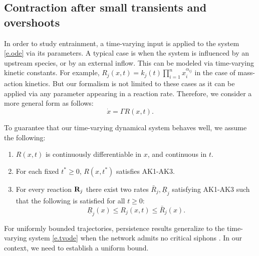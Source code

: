 \documentclass[onefignum,onetabnum]{siamonline220329}
\newcommand{\R}{{\rm \bf R}}
\begin{document}
{\subsection{Contraction after small transients and overshoots}

In order to study entrainment, a time-varying input is applied to the system \eqref{e.ode} via its parameters. A typical case is when the system is influenced by an upstream species, or by an external inflow. This can be modeled via time-varying kinetic constants. For example, $R_j(x,t)=k_j(t) \prod_{i=1}^n x_i^{\alpha_{ij}}$ in the case of mass-action kinetics.  But our formalism is not limited to these cases as it can be applied via any parameter appearing in a reaction rate. Therefore, we consider a more general form as follows:
\begin{equation}\label{e.tvode}
	\dot x= \Gamma R(x,t).
\end{equation}

To guarantee that our time-varying dynamical system behaves well, we assume the following:
\begin{enumerate}
	\item $R(x,t)$ is continuously differentiable in $x$, and continuous in $t$. 
	\item For each fixed $t^*\ge 0$, $R(x,t^*)$ satisfies AK1-AK3.
	
	\item For every reaction $\R_j$ there exist two rates $\bar R_j, \underline R_j$ satisfying AK1-AK3 such that the following is satisfied for all $t\ge 0$:
	\[ \underline R_j(x) \le R_j(x,t) \le \bar R_j(x).\]
\end{enumerate}

For uniformly bounded trajectories, persistence results generalize to the time-varying system \eqref{e.tvode} when the network admits no critical siphons \cite{angeli11}.  In our context, we need to establish a uniform bound{.}

}
\end{document}
